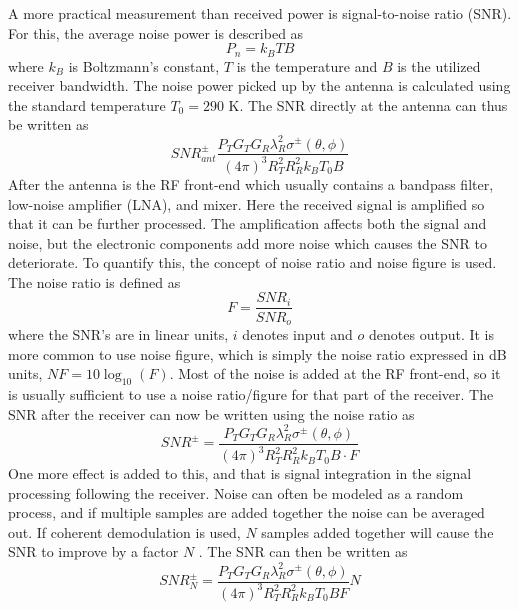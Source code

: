 \documentclass[10pt,a4paper]{eitExjobb}
\begin{document}
	A more practical measurement than received power is signal-to-noise ratio (SNR). For this, the average noise power is described as \cite{Young2004}
	\begin{equation*}
	P_n = k_B TB
	\end{equation*}
	where $k_B$ is Boltzmann's constant, $T$ is the temperature and $B$ is the utilized receiver bandwidth. The noise power picked up by the antenna is calculated using the standard temperature $T_0 = 290$ K. The SNR directly at the antenna can thus be written as
	\begin{equation*}
	\mathit{SNR}^\pm_{ant} \frac{P_T G_T G_R \lambda_R^2 \sigma^\pm (\theta,\phi)}{(4\pi)^3 R_T^2 R_R^2 k_B T_0 B}
	\end{equation*}
	After the antenna is the RF front-end which usually contains a bandpass filter, low-noise amplifier (LNA), and mixer. Here the received signal is amplified so that it can be further processed. The amplification affects both the signal and noise, but the electronic components add more noise which causes the SNR to deteriorate. To quantify this, the concept of noise ratio and noise figure is used. The noise ratio is defined as \cite{Young2004}
	\begin{equation*}
	F = \frac{\mathit{SNR}_i}{\mathit{SNR}_o}
	\end{equation*}
	where the SNR's are in linear units, $i$ denotes input and $o$ denotes output. It is more common to use noise figure, which is simply the noise ratio expressed in dB units, $\mathit{NF} = 10\log_{10}(F)$. Most of the noise is added at the RF front-end, so it is usually sufficient to use a noise ratio/figure for that part of the receiver. The SNR after the receiver can now be written using the noise ratio as
	\begin{equation*}
	\mathit{SNR}^\pm = \frac{P_T G_T G_R \lambda_R^2 \sigma^\pm (\theta,\phi)}{(4\pi)^3 R_T^2 R_R^2 k_B T_0 B \cdot F}
	\end{equation*}
	One more effect is added to this, and that is signal integration in the signal processing following the receiver. Noise can often be modeled as a random process, and if multiple samples are added together the noise can be averaged out. If coherent demodulation is used, $N$ samples added together will cause the SNR to improve by a factor $N$ \cite{Richards2012}. The SNR can then be written as
	\begin{equation*}
	\textit{SNR}^\pm_N = \frac{P_T G_T G_R \lambda_R^2 \sigma^\pm (\theta,\phi)}{(4\pi)^3 R_T^2 R_R^2 k_B T_0 B F} N
	\end{equation*}
	
\end{document}
